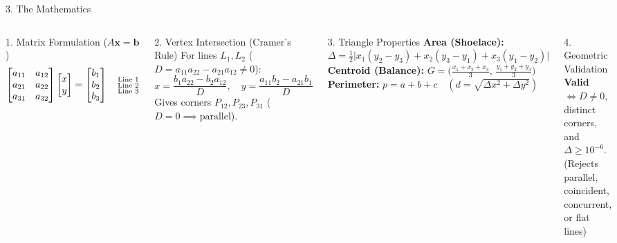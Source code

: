 \documentclass[aspectratio=169,11pt]{beamer}
\begin{document}
\begin{frame}{3. The Mathematics}
  \begin{columns}[T]
      \begin{block}{1. Matrix Formulation ($A\mathbf{x} = \mathbf{b}$)}
        \[
          \begin{bmatrix} a_{11} & a_{12} \\ a_{21} & a_{22} \\ a_{31} & a_{32} \end{bmatrix}
          \begin{bmatrix} x \\ y \end{bmatrix} =
          \begin{bmatrix} b_1 \\ b_2 \\ b_3 \end{bmatrix}
          \quad \begin{subarray}{l} \text{\scriptsize Line 1} \\ \text{\scriptsize Line 2} \\ \text{\scriptsize Line 3} \end{subarray}
        \]
      \end{block}
      \vspace{2pt}
      \begin{block}{2. Vertex Intersection (Cramer's Rule)}
        \footnotesize
        For lines $L_1, L_2$ ($D = a_{11}a_{22} - a_{21}a_{12} \neq 0$):
        \[
          x = \frac{b_1 a_{22} - b_2 a_{12}}{D}, \quad
          y = \frac{a_{11} b_2 - a_{21} b_1}{D}
        \]
        Gives corners $P_{12}, P_{23}, P_{31}$ ($D=0 \implies \text{parallel}$).
      \end{block}

      \begin{block}{3. Triangle Properties}
        \footnotesize
        \textbf{Area (Shoelace):} $\Delta = \tfrac{1}{2}\bigl|x_1(y_2-y_3) + x_2(y_3-y_1) + x_3(y_1-y_2)\bigr|$\\[4pt]
        \textbf{Centroid (Balance):} $G = \bigl(\tfrac{x_1 + x_2 + x_3}{3}, \, \tfrac{y_1 + y_2 + y_3}{3}\bigr)$\\[4pt]
        \textbf{Perimeter:} $p = a + b + c \quad (d = \sqrt{\Delta x^2 + \Delta y^2})$
      \end{block}
      \vspace{4pt}
      \begin{exampleblock}{4. Geometric Validation}
        \footnotesize
        \textbf{Valid} $\iff D \neq 0$, distinct corners, and $\Delta \ge 10^{-6}$.\\[1pt]
        \scriptsize (Rejects parallel, coincident, concurrent, or flat lines)
      \end{exampleblock}
  \end{columns}
\end{frame}
    
\end{document}
